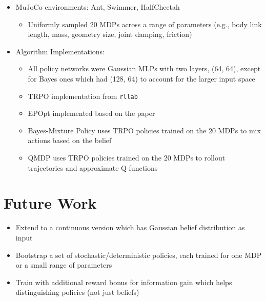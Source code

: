 \documentclass{article}
\begin{document}
\begin{itemize}
	\item MuJoCo environments: Ant, Swimmer, HalfCheetah
	\begin{itemize}
		\item Uniformly sampled 20 MDPs across a range of parameters (e.g., body link length, mass, geometry size, joint damping, friction)
	\end{itemize}
	\item Algorithm Implementations:
	\begin{itemize}
		\item All policy networks were Gaussian MLPs with two layers, (64, 64), except for Bayes ones which had (128, 64) to account for the larger input space
		\item TRPO implementation from \texttt{rllab}
		\item EPOpt implemented based on the paper
		\item Bayes-Mixture Policy uses TRPO policies trained on the 20 MDPs to mix actions based on the belief
		\item QMDP uses TRPO policies trained on the 20 MDPs to rollout trajectories and approximate Q-functions
	\end{itemize}
\end{itemize}

\section{Future Work}

\begin{itemize}
	\item Extend to a continuous version which has Gaussian belief distribution as input
	\item Bootstrap a set of stochastic/deterministic policies, each trained for one MDP or a small range of parameters
	\item Train with additional reward bonus for information gain which helps distinguishing policies (not just beliefs)
\end{itemize}

%
\end{document}
